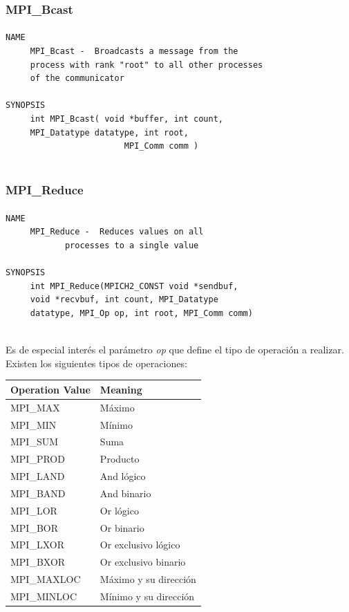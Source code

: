 \documentclass[es,gi]{ifirak}
\begin{document}
\begin{multicols}{2}
\subsubsection{MPI\_Bcast}
\paragraph{}


\begin{verbatim}
NAME
     MPI_Bcast -  Broadcasts a message from the 
     process with rank "root" to all other processes
     of the communicator

SYNOPSIS
     int MPI_Bcast( void *buffer, int count, 
     MPI_Datatype datatype, int root,
           				MPI_Comm comm )
       
\end{verbatim}

\subsubsection{MPI\_Reduce}
\paragraph{}

\begin{verbatim}
NAME
     MPI_Reduce -  Reduces values on all
            processes to a single value

SYNOPSIS
     int MPI_Reduce(MPICH2_CONST void *sendbuf, 
     void *recvbuf, int count, MPI_Datatype 
     datatype, MPI_Op op, int root, MPI_Comm comm)
     
\end{verbatim}

Es de especial interés el parámetro \textit{op} que define el tipo de operación a realizar. Existen los siguientes tipos de operaciones:

\begin{center}
	\begin{tabular}{|l|l|}
		\hline
		\cellcolor{gray}Operation Value & \cellcolor{gray}Meaning \\
		\hline
		MPI\_MAX & Máximo\\
		MPI\_MIN & Mínimo\\
		MPI\_SUM & Suma\\
		MPI\_PROD & Producto\\
		MPI\_LAND & And lógico	\\
		MPI\_BAND & And binario	\\
		MPI\_LOR & Or lógico\\
		MPI\_BOR & Or binario	\\
		MPI\_LXOR & Or exclusivo lógico	\\
		MPI\_BXOR & Or exclusivo binario	\\
		MPI\_MAXLOC & Máximo y su dirección	\\
		MPI\_MINLOC & Mínimo y su dirección	\\
		\hline
	\end{tabular}
\end{center}


\end{multicols}
\end{document}
